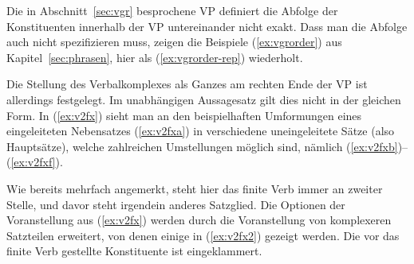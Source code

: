 Die in Abschnitt~\ref{sec:vgr} besprochene VP definiert die Abfolge der Konstituenten innerhalb der VP untereinander nicht exakt.
Dass man die Abfolge auch nicht spezifizieren muss, zeigen die Beispiele (\ref{ex:vgrorder}) aus Kapitel~\ref{sec:phrasen}, hier als (\ref{ex:vgrorder-rep}) wiederholt.

\begin{exe}
  \ex\label{ex:vgrorder-rep}
  \begin{xlist}
    \ex{\ThePhrasenExOne}
    \ex{\ThePhrasenExTwo}
  \end{xlist}
\end{exe}

Die Stellung des Verbalkomplexes als Ganzes am rechten Ende der VP ist allerdings festgelegt.
Im unabhängigen Aussagesatz gilt dies nicht in der gleichen Form.
In (\ref{ex:v2fx}) sieht man an den beispielhaften Umformungen eines eingeleiteten Nebensatzes (\ref{ex:v2fxa}) in verschiedene uneingeleitete Sätze (also Hauptsätze), welche zahlreichen Umstellungen möglich sind, nämlich (\ref{ex:v2fxb})--(\ref{ex:v2fxf}).

\begin{exe}
  \ex\label{ex:v2fx}
  \begin{xlist}
  \end{xlist}
\end{exe}

Wie bereits mehrfach angemerkt, steht hier das finite Verb immer an zweiter Stelle, und davor steht irgendein anderes Satzglied.
Die Optionen der Voranstellung aus (\ref{ex:v2fx}) werden durch die Voranstellung von komplexeren Satzteilen erweitert, von denen einige in (\ref{ex:v2fx2}) gezeigt werden.
Die vor das finite Verb gestellte Konstituente ist eingeklammert.

\begin{exe}
  \ex\label{ex:v2fx2}
  \begin{xlist}
  \end{xlist}
\end{exe}

